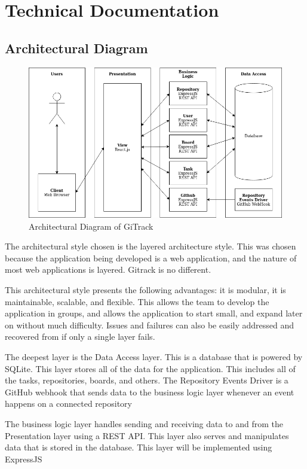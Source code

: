 \documentclass{article}
\begin{document}
\section{Technical Documentation}
\subsection{Architectural Diagram}
\begin{figure}[H]
	\includegraphics[width=1\textwidth]{arch-diagram}\par\vspace{0.5cm}
	\caption{Architectural Diagram of GiTrack}
	\label{fig:archdiag}
\end{figure}

The architectural style chosen is the layered architecture style. This was
chosen because the application being developed is a web application, and the
nature of most web applications is layered. Gitrack is no different.

This architectural style presents the following advantages: it is modular, it is
maintainable, scalable, and flexible. This allows the team to develop the
application in groups, and allows the application to start small, and expand
later on without much difficulty. Issues and failures can also be easily
addressed and recovered from if only a single layer fails.

The deepest layer is the Data Access layer. This is a database that is powered
by SQLite. This layer stores all of the data for the application. This includes
all of the tasks, repositories, boards, and others. The Repository Events Driver
is a GitHub webhook that sends data to the business logic layer whenever an
event happens on a connected repository

The business logic layer handles sending and receiving data to and from the
Presentation layer using a REST API. This layer also serves and manipulates data
that is stored in the database. This layer will be implemented using ExpressJS
\end{document}
